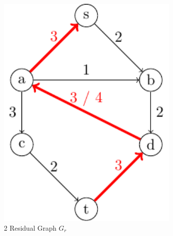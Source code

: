 \begin{minipage}{0.2\textwidth}
\begin{figure}[H]
  \centering
  \includegraphics[width=0.8\textwidth]{Figure/maxflow_d2_5.pdf}
  \caption*{2 Residual Graph \(G_r\)}
\end{figure}
\end{minipage}

